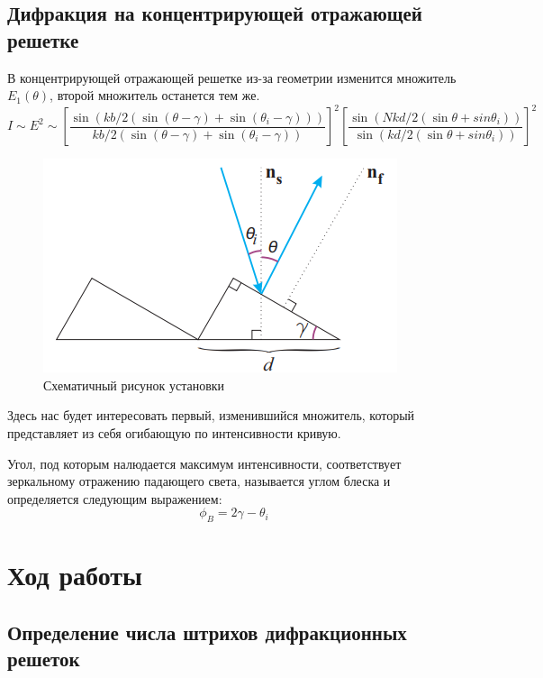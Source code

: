 \documentclass[a4paper,14pt]{extarticle}
\begin{document}
			\subsection{Дифракция на концентрирующей отражающей решетке}
			В концентрирующей отражающей решетке из-за геометрии изменится множитель $E_1(\theta)$, второй множитель останется тем же.
			\begin{equation}
				I \sim E^2 \sim [\frac{\sin(k b / 2 (\sin(\theta - \gamma) + \sin(\theta_i - \gamma)))}{k b / 2 (\sin(\theta - \gamma) + \sin(\theta_i - \gamma))}]^2 [\frac{\sin(N k d / 2 (\sin{\theta} + sin{\theta_i}))}{\sin(k d / 2 (\sin{\theta} + sin{\theta_i}))}]^2
			\end{equation}
			
			\begin{figure}[h!]
				\centering
				\includegraphics[width=1\linewidth]{Diff2.png}
				\caption{Схематичный рисунок установки}
				\label{fig2}
			\end{figure}
		
			Здесь нас будет интересовать первый, изменившийся множитель, который представляет из себя огибающую по интенсивности кривую.
			
			Угол, под которым налюдается максимум интенсивности, соответствует зеркальному отражению падающего света, называется углом блеска и определяется следующим выражением:
			\begin{equation}
				\phi_B = 2\gamma - \theta_i
			\end{equation}
			
	\section{Ход работы}
		\subsection{Определение числа штрихов дифракционных решеток}
\end{document}
